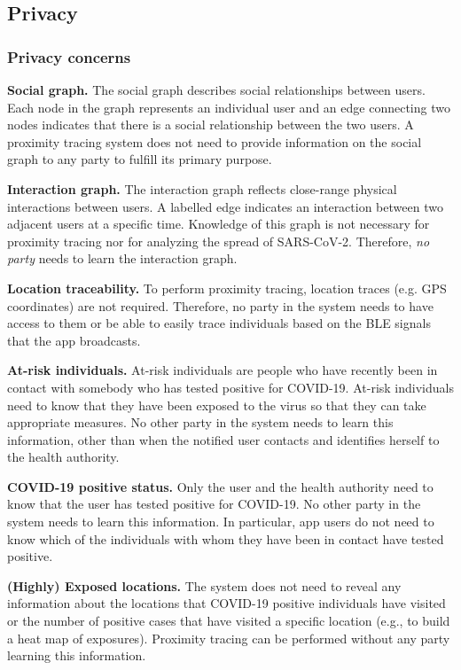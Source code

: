 \documentclass{article}
\begin{document}
\subsection{Privacy}\label{privacy}

\subsubsection{Privacy concerns}\label{privacy-concerns}

\textbf{Social graph.} The social graph describes social relationships
between users. Each node in the graph represents an individual user and
an edge connecting two nodes indicates that there is a social
relationship between the two users. A proximity tracing system does not
need to provide information on the social graph to any party to fulfill
its primary purpose.

\textbf{Interaction graph.} The interaction graph reflects close-range
physical interactions between users. A labelled edge indicates an
interaction between two adjacent users at a specific time. Knowledge of
this graph is not necessary for proximity tracing nor for analyzing the
spread of SARS-CoV-2. Therefore, \emph{no party} needs to learn the
interaction graph.

\textbf{Location traceability.} To perform proximity tracing, location
traces (e.g. GPS coordinates) are not required. Therefore, no party in
the system needs to have access to them or be able to easily trace
individuals based on the BLE signals that the app broadcasts.

\textbf{At-risk individuals.} At-risk individuals are people who have
recently been in contact with somebody who has tested positive for
COVID-19. At-risk individuals need to know that they have been exposed
to the virus so that they can take appropriate measures. No other party
in the system needs to learn this information, other than when the
notified user contacts and identifies herself to the health authority.

\textbf{COVID-19 positive status.} Only the user and the health
authority need to know that the user has tested positive for COVID-19.
No other party in the system needs to learn this information. In
particular, app users do not need to know which of the individuals with
whom they have been in contact have tested positive.

\textbf{(Highly) Exposed locations.} The system does not need to reveal
any information about the locations that COVID-19 positive individuals
have visited or the number of positive cases that have visited a
specific location (e.g., to build a heat map of exposures). Proximity
tracing can be performed without any party learning this information.
\end{document}
